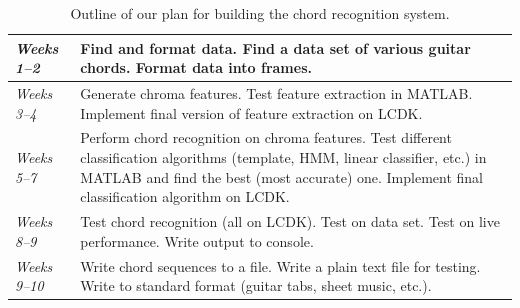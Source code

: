 \documentclass[journal]{IEEEtran}
\begin{document}
\def\arraystretch{1.5}
\begin{table}[ht]
    \centering
    \caption{Outline of our plan for building the chord recognition system.}
    \begin{tabularx}{0.95\linewidth}{|>{\hsize=0.4\hsize}X|>{\hsize=1.6\hsize}X|}
        \hline
            \textit{Weeks 1--2}
            &
            Find and format data.
            Find a data set of various guitar chords.
            Format data into frames. \\
        \hline
            \textit{Weeks 3--4}
            &
            Generate chroma features.
            Test feature extraction in MATLAB.
            Implement final version of feature extraction on LCDK. \\
        \hline
            \textit{Weeks 5--7}
            &
            Perform chord recognition on chroma features.
            Test different classification algorithms (template, HMM, linear classifier, etc.) in MATLAB and find the best (most accurate) one.
            Implement final classification algorithm on LCDK. \\
        \hline
            \textit{Weeks 8--9}
            &
            Test chord recognition (all on LCDK).
            Test on data set.
            Test on live performance.
            Write output to console. \\
        \hline
            \textit{Weeks 9--10}
            &
            Write chord sequences to a file.
            Write a plain text file for testing.
            Write to standard format (guitar tabs, sheet music, etc.). \\
        \hline
    \end{tabularx}
    \label{tab:plan}
\end{table}
\end{document}
